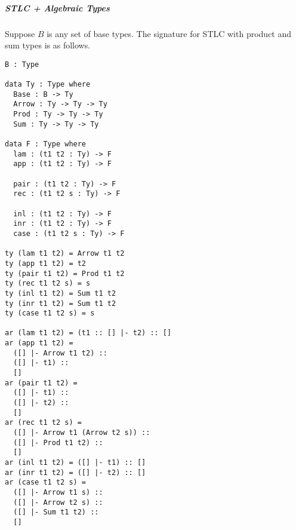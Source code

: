 \documentclass{article}
\theoremstyle{definition}
\begin{document}
\subparagraph{STLC + Algebraic Types} Suppose $B$ is any set of base types. The signature for STLC with product and sum types is as follows.
\begin{verbatim}
B : Type

data Ty : Type where
  Base : B -> Ty
  Arrow : Ty -> Ty -> Ty
  Prod : Ty -> Ty -> Ty
  Sum : Ty -> Ty -> Ty
  
data F : Type where
  lam : (t1 t2 : Ty) -> F
  app : (t1 t2 : Ty) -> F
  
  pair : (t1 t2 : Ty) -> F
  rec : (t1 t2 s : Ty) -> F
  
  inl : (t1 t2 : Ty) -> F
  inr : (t1 t2 : Ty) -> F
  case : (t1 t2 s : Ty) -> F
  
ty (lam t1 t2) = Arrow t1 t2
ty (app t1 t2) = t2
ty (pair t1 t2) = Prod t1 t2
ty (rec t1 t2 s) = s
ty (inl t1 t2) = Sum t1 t2
ty (inr t1 t2) = Sum t1 t2
ty (case t1 t2 s) = s

ar (lam t1 t2) = (t1 :: [] |- t2) :: []
ar (app t1 t2) =
  ([] |- Arrow t1 t2) ::
  ([] |- t1) ::
  []
ar (pair t1 t2) =
  ([] |- t1) ::
  ([] |- t2) ::
  []
ar (rec t1 t2 s) =
  ([] |- Arrow t1 (Arrow t2 s)) ::
  ([] |- Prod t1 t2) ::
  []
ar (inl t1 t2) = ([] |- t1) :: []
ar (inr t1 t2) = ([] |- t2) :: []
ar (case t1 t2 s) =
  ([] |- Arrow t1 s) ::
  ([] |- Arrow t2 s) ::
  ([] |- Sum t1 t2) ::
  []
\end{verbatim}
\end{document}
